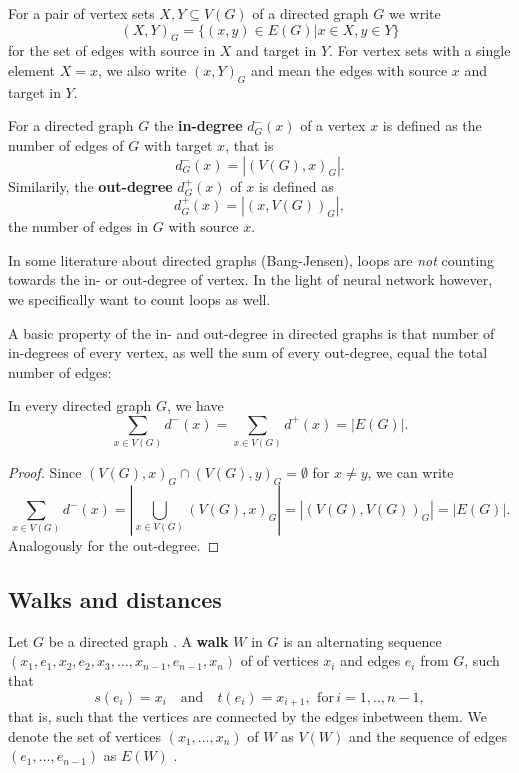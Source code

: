 \begin{remark} 
   For a pair of vertex sets $X,Y
  \subseteq V(G)$ of a directed graph $G$ we write
  \[
  (X,Y)_G = \{(x,y) \in E(G) | x \in X, y \in Y \}
  \]
  for the set of edges with source in $X$ and target in $Y$. For
  vertex sets with a single element $X = {x}$, we also write $(x,Y)_G$
  and mean the edges with source $x$ and target in $Y$.
\end{remark}


\begin{remark} 
  For a directed graph $G$ the \textbf{in-degree} $d^-_G(x)$ of a
  vertex $x$ is defined as the number of edges of $G$ with target $x$,
  that is
  \[
  d^-_G(x) = \left|(V(G),x)_G\right|.
  \]
  Similarily, the \textbf{out-degree} $d^+_G(x)$ of $x$ is defined as
  \[
  d^+_G(x) = \left|(x, V(G))_G\right|,
  \]
  the number of edges in $G$ with source $x$.
\end{remark}

\begin{remark}[Side]
  In some literature about directed graphs (Bang-Jensen), loops are
  \textit{not} counting towards the in- or out-degree of vertex. In
  the light of neural network however, we specifically want to count
  loops as well.
\end{remark}

A basic property of the in- and out-degree in directed graphs is that
number of in-degrees of every vertex, as well the sum of every
out-degree, equal the total number of edges:

\begin{proposition}
  In every directed graph $G$, we have
  \[
  \sum_{x \in V(G)} d^-(x) = \sum_{x \in V(G)} d^+(x) = | E(G) |.
  \]
\end{proposition}

\begin{proof}
  Since $(V(G),x)_G \cap (V(G),y)_G = \emptyset$ for $x \ne y$, we can
  write
  \[
  \sum_{x \in V(G)} d^-(x) = \left| \bigcup_{x \in V(G)} (V(G),x)_G
  \right| = \left| (V(G),V(G))_G \right| = | E(G) |.
  \]
  Analogously for the out-degree.
\end{proof}


\subsection*{Walks and distances}

Let $G$ be a directed graph . A
\textbf{walk} $W$ in $G$ is an alternating sequence
$(x_1,e_1,x_2,e_2,x_3,\ldots,x_{n-1},e_{n-1},x_n)$ of of vertices
$x_i$ and edges $e_i$ from $G$, such that
\[
s(e_i) = x_i \quad \mathrm{and} \quad t(e_i) = x_{i+1}, \:\,
\mathrm{for}\, i=1,..,n-1,
\]
that is, such that the vertices are connected by the edges inbetween
them. We denote the set of vertices $(x_1,\ldots,x_n)$ of $W$ as
$V(W)$ and the sequence of edges $(e_1,\dots,e_{n-1})$ as $E(W)$
.

